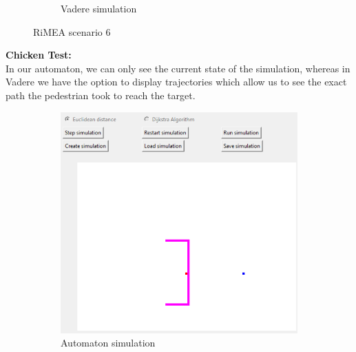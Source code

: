 \begin{figure}[H]
\begin{subfigure}[b]{0.3\textwidth}
     \caption{Vadere simulation}
     \label{fig: rimea_6b}
 \end{subfigure}
 \caption{RiMEA scenario 6}
\label{fig: rimea_6}
\end{figure}



\textbf{Chicken Test:}\\
In our automaton, we can only see the current state of the simulation, whereas in Vadere we have the option to display trajectories which allow us to see the exact path the pedestrian took to reach the target. 

\begin{figure}[H]
 \centering
 \begin{subfigure}[b]{0.32\textwidth}
     \centering
     \includegraphics[width=\textwidth]{images/1-task4_chicken_first_contact.png}
    \caption{Automaton simulation}
    \label{fig: chicken-automaton}
 \end{subfigure}
 \begin{subfigure}[b]{0.3\textwidth}
      \centering

\end{subfigure}
\end{figure}

